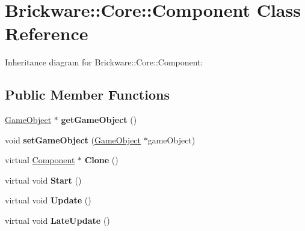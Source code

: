 \hypertarget{classBrickware_1_1Core_1_1Component}{}\section{Brickware\+:\+:Core\+:\+:Component Class Reference}
\label{classBrickware_1_1Core_1_1Component}


Inheritance diagram for Brickware\+:\+:Core\+:\+:Component\+:
\subsection*{Public Member Functions}
\begin{DoxyCompactItemize}
\item 
\hypertarget{classBrickware_1_1Core_1_1Component_abed36db99f1ee0ba84a5fb8485e17428}{}\hyperlink{classBrickware_1_1Core_1_1GameObject}{Game\+Object} $\ast$ {\bfseries get\+Game\+Object} ()\label{classBrickware_1_1Core_1_1Component_abed36db99f1ee0ba84a5fb8485e17428}

\item 
\hypertarget{classBrickware_1_1Core_1_1Component_ac4e8654d102caa41cf943e49bf774560}{}void {\bfseries set\+Game\+Object} (\hyperlink{classBrickware_1_1Core_1_1GameObject}{Game\+Object} $\ast$game\+Object)\label{classBrickware_1_1Core_1_1Component_ac4e8654d102caa41cf943e49bf774560}

\item 
\hypertarget{classBrickware_1_1Core_1_1Component_ad636e7ebc546b040bd14a828428c1455}{}virtual \hyperlink{classBrickware_1_1Core_1_1Component}{Component} $\ast$ {\bfseries Clone} ()\label{classBrickware_1_1Core_1_1Component_ad636e7ebc546b040bd14a828428c1455}

\item 
\hypertarget{classBrickware_1_1Core_1_1Component_ad13ee8ec7dd72811a24d52b4844ab014}{}virtual void {\bfseries Start} ()\label{classBrickware_1_1Core_1_1Component_ad13ee8ec7dd72811a24d52b4844ab014}

\item 
\hypertarget{classBrickware_1_1Core_1_1Component_a53ec66587fb3229c44cadac8a555001d}{}virtual void {\bfseries Update} ()\label{classBrickware_1_1Core_1_1Component_a53ec66587fb3229c44cadac8a555001d}

\item 
\hypertarget{classBrickware_1_1Core_1_1Component_a0df08e4d0156afa89c52738593d02795}{}virtual void {\bfseries Late\+Update} ()\label{classBrickware_1_1Core_1_1Component_a0df08e4d0156afa89c52738593d02795}


\end{DoxyCompactItemize}
